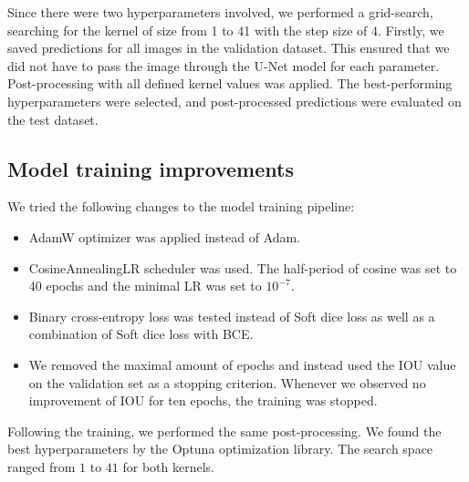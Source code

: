 Since there were two hyperparameters involved, we performed a grid-search, searching for the kernel of size from 1 to 41 with the step size of 4. Firstly, we saved predictions for all images in the validation dataset. This ensured that we did not have to pass the image through the U-Net model for each parameter. Post-processing with all defined kernel values was applied. The best-performing hyperparameters were selected, and post-processed predictions were evaluated on the test dataset.

\subsection{Model training improvements}
We tried the following changes to the model training pipeline:
\begin{itemize}
    \item AdamW optimizer was applied instead of Adam.
    \item CosineAnnealingLR scheduler was used. The half-period of cosine was set to 40 epochs and the minimal LR was set to $10^{-7}$.
    \item Binary cross-entropy loss was tested instead of Soft dice loss as well as a combination of Soft dice loss with BCE.
    \item We removed the maximal amount of epochs and instead used the IOU value on the validation set as a stopping criterion. Whenever we observed no improvement of IOU for ten epochs, the training was stopped.
\end{itemize}

Following the training, we performed the same post-processing. We found the best hyperparameters by the Optuna optimization library. The search space ranged from $1$ to $41$ for both kernels.


